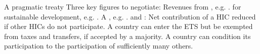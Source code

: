\documentclass[aspectratio=169,xcolor=dvipsnames, 11pt,mathserif]{beamer}
\begin{document}
\begin{frame}{A pragmatic treaty}
    \bbsp
    \ip Three key figures to negotiate:
    \bbsp \ip Revenues from , e.g. .
    \ip {} for sustainable development, e.g. .
    \ip A , e.g. .
    \ee
    \ip {} and :
    \bbsp \ip Net contribution of a HIC reduced if other HICs do not participate.
    \ip A country can enter the ETS but be exempted from taxes and transfers, if accepted by a majority.
    \ip A country can condition its participation to the participation of sufficiently many others.
    \ee
    \ee
\end{frame}







\end{document}
